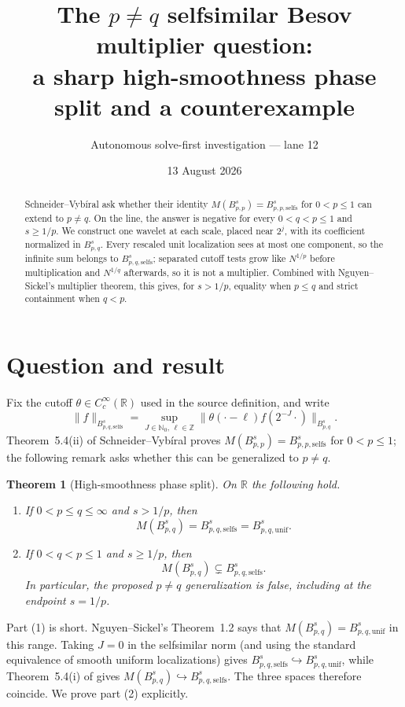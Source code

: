 \documentclass[9pt]{extarticle}
\title{The $p\ne q$ selfsimilar Besov multiplier question:\\
\large a sharp high-smoothness phase split and a counterexample}
\author{Autonomous solve-first investigation --- lane 12}
\date{13 August 2026}
\newtheorem{theorem}{Theorem}
\newcommand{\R}{\mathbb R}
\newcommand{\Z}{\mathbb Z}
\newcommand{\N}{\mathbb N}
\newcommand{\selfs}{\mathrm{selfs}}
\newcommand{\unif}{\mathrm{unif}}
\newcommand{\M}{M}
\begin{document}
\maketitle

\begin{abstract}
Schneider--Vyb\'iral ask whether their identity
$\M(B^s_{p,p})=B^s_{p,p,\selfs}$ for $0<p\leq1$ can extend to
$p\ne q$.  On the line, the answer is negative for every
$0<q<p\leq1$ and $s\geq1/p$.  We construct one wavelet at each scale,
placed near $2^j$, with its coefficient normalized in $B^s_{p,q}$.
Every rescaled unit localization sees at most one component, so the
infinite sum belongs to $B^s_{p,q,\selfs}$; separated cutoff tests grow
like $N^{1/p}$ before multiplication and $N^{1/q}$ afterwards, so it is
not a multiplier.  Combined with Nguyen--Sickel's multiplier theorem,
this gives, for $s>1/p$, equality when $p\leq q$ and strict containment
when $q<p$.
\end{abstract}

\section{Question and result}

Fix the cutoff $\theta\in C_c^\infty(\R)$ used in the source definition,
and write
\[
 \|f\|_{B^s_{p,q,\selfs}}
 =\sup_{J\in\N_0,\,\ell\in\Z}
   \|\theta(\cdot-\ell)f(2^{-J}\cdot)\|_{B^s_{p,q}}.
\]
Theorem~5.4(ii) of Schneider--Vyb\'iral \cite{SV} proves
$\M(B^s_{p,p})=B^s_{p,p,\selfs}$ for $0<p\leq1$; the following remark
asks whether this can be generalized to $p\ne q$.

\begin{theorem}[High-smoothness phase split]\label{thm:main}
On $\R$ the following hold.
\begin{enumerate}
 \item If $0<p\leq q\leq\infty$ and $s>1/p$, then
 \[
   \M(B^s_{p,q})=B^s_{p,q,\selfs}=B^s_{p,q,\unif}.
 \]
 \item If $0<q<p\leq1$ and $s\geq1/p$, then
 \[
   \M(B^s_{p,q})\subsetneq B^s_{p,q,\selfs}.
 \]
 In particular, the proposed $p\ne q$ generalization is false, including
 at the endpoint $s=1/p$.
\end{enumerate}
\end{theorem}

Part (1) is short.  Nguyen--Sickel's Theorem~1.2 \cite{NS} says that
$\M(B^s_{p,q})=B^s_{p,q,\unif}$ in this range.  Taking $J=0$ in the
selfsimilar norm (and using the standard equivalence of smooth uniform
localizations) gives
$B^s_{p,q,\selfs}\hookrightarrow B^s_{p,q,\unif}$, while
Theorem~5.4(i) of \cite{SV} gives
$\M(B^s_{p,q})\hookrightarrow B^s_{p,q,\selfs}$.  The three spaces
therefore coincide.  We prove part (2) explicitly.
\end{document}
